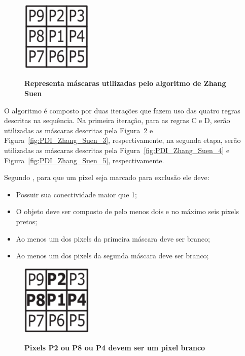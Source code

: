 \documentclass[12pt,oneside,a4paper,english,french,spanish,brazil,]{abntex2}
\begin{document}
\begin{figure}[ht]
\centering
\caption{\textbf{Representa máscaras utilizadas pelo algoritmo de Zhang Suen}}
\includegraphics[width=0.3\textwidth]{imagens/PDI_Zhang_Suen_1.PNG}
\label{fig:PDI_Zhang_Suen_1}
\end{figure}

O algoritmo é composto por duas iterações que fazem uso das quatro regras descritas na sequência. Na primeira iteração, para as regras C e D, serão utilizadas as máscaras descritas pela Figura~\ref{fig:PDI_Zhang_Suen_2} e Figura~\ref{fig:PDI_Zhang_Suen_3}, respectivamente, na segunda etapa, serão utilizadas as máscaras descritas pela Figura~\ref{fig:PDI_Zhang_Suen_4} e Figura~\ref{fig:PDI_Zhang_Suen_5}, respectivamente.

Segundo \citet{guilherme:2007}, para que um pixel seja marcado para exclusão ele deve:
\begin{itemize}
\item Possuir sua conectividade maior que 1;
\item O objeto deve ser composto de pelo menos dois e no máximo seis pixels pretos;
\item Ao menos um dos pixels da primeira máscara deve ser branco;
\item Ao menos um dos pixels da segunda máscara deve ser branco;
\end{itemize}

\begin{figure}[ht]
\centering
\caption{\textbf{Pixels P2 ou P8 ou P4 devem ser um pixel branco}}
\includegraphics[width=0.3\textwidth]{imagens/PDI_Zhang_Suen_2.PNG}
\label{fig:PDI_Zhang_Suen_2}
\end{figure}
\end{document}
